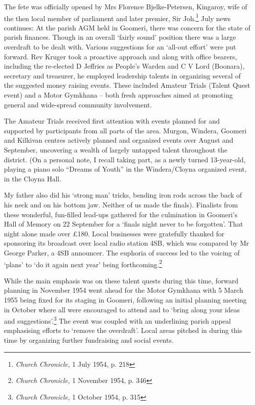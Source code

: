 The fete was officially opened by Mrs Florence Bjelke-Petersen, Kingaroy, wife of the then local member of parliament and later premier, Sir Joh.\footnote{\emph{Church Chronicle,} 1 July 1954, p. 218} July news continues: At the parish AGM held in Goomeri, there was concern for the state of parish finances. Though in an overall `fairly sound' position there was a large overdraft to be dealt with. Various suggestions for an `all-out effort' were put forward. Rev Kruger took a proactive approach and along with office bearers, including the re-elected D Jeffries as People's Warden and C V Lord (Boonara), secretary and treasurer, he employed leadership talents in organizing several of the suggested money raising events. These included Amateur Trials (Talent Quest event) and a Motor Gymkhana -- both fresh approaches aimed at promoting general and wide-spread community involvement.


The Amateur Trials received first attention with events planned for and supported by participants from all parts of the area. Murgon, Windera, Goomeri and Kilkivan centres actively planned and organized events over August and September, uncovering a wealth of largely untapped talent throughout the district. (On a personal note, I recall taking part, as a newly turned 13-year-old, playing a piano solo ``Dreams of Youth'' in the Windera/Cloyna organized event, in the Cloyna Hall.



My father also did his `strong man' tricks, bending iron rods across the back of his neck and on his bottom jaw. Neither of us made the finals). Finalists from these wonderful, fun-filled lead-ups gathered for the culmination in Goomeri's Hall of Memory on 22 September for a `finals night never to be forgotten'. That night alone made over \pounds180. Local businesses were gratefully thanked for sponsoring its broadcast over local radio station 4SB, which was compared by Mr George Parker, a 4SB announcer. The euphoria of success led to the voicing of `plans' to `do it again next year' being forthcoming.\footnote{\emph{Church Chronicle,} 1 November 1954, p. 346}


While the main emphasis was on these talent quests during this time, forward planning in November 1954 went ahead for the Motor Gymkhana with 5 March 1955 being fixed for its staging in Goomeri, following an initial planning meeting in October where all were encouraged to attend and to `bring along your ideas and suggestions'.\footnote{\emph{Church Chronicle,} 1 October 1954, p. 315} The event was coupled with an underlining parish appeal emphasising efforts to `remove the overdraft'. Local areas pitched in during this time by organizing further fundraising and social events.


